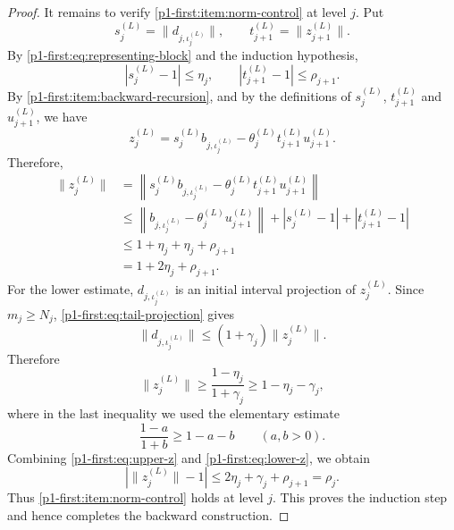 \documentclass[10pt,a4paper]{amsart}
\begin{document}
\begin{proof}
It remains to verify \ref{p1-first:item:norm-control} at level $j$. Put
\begin{equation*}
        s_j^{(L)}=\|d_{j,\iota_j^{(L)}}\|,
        \qquad
        t_{j+1}^{(L)}=\|z_{j+1}^{(L)}\|.
\end{equation*}
By \eqref{p1-first:eq:representing-block} and the induction hypothesis,
\begin{equation*}
        |s_j^{(L)}-1|\leq\eta_j,
        \qquad
        |t_{j+1}^{(L)}-1|\leq\rho_{j+1}.
\end{equation*}
By \ref{p1-first:item:backward-recursion}, and by the definitions of $s_j^{(L)}$, $t_{j+1}^{(L)}$ and $u_{j+1}^{(L)}$, we have
\begin{equation*}
        z_j^{(L)}=s_j^{(L)}b_{j,\iota_j^{(L)}}-\theta_j^{(L)}t_{j+1}^{(L)}u_{j+1}^{(L)}.
\end{equation*}
Therefore,
\begin{equation}
\label{p1-first:eq:upper-z}
\begin{aligned}
        \|z_j^{(L)}\|
        &=\left\|s_j^{(L)}b_{j,\iota_j^{(L)}}-\theta_j^{(L)}t_{j+1}^{(L)}u_{j+1}^{(L)}\right\|\\
        &\leq \left\|b_{j,\iota_j^{(L)}}-\theta_j^{(L)}u_{j+1}^{(L)}\right\|+|s_j^{(L)}-1|+|t_{j+1}^{(L)}-1|\\
        &\leq 1+\eta_j+\eta_j+\rho_{j+1}\\
        &=1+2\eta_j+\rho_{j+1}.
\end{aligned}
\end{equation}
For the lower estimate, $d_{j,\iota_j^{(L)}}$ is an initial interval projection of $z_j^{(L)}$. Since $m_j\geq N_j$, \eqref{p1-first:eq:tail-projection} gives
\begin{equation*}
        \|d_{j,\iota_j^{(L)}}\|\leq (1+\gamma_j)\|z_j^{(L)}\|.
\end{equation*}
Therefore
\begin{equation}
\label{p1-first:eq:lower-z}
        \|z_j^{(L)}\|\geq \frac{1-\eta_j}{1+\gamma_j}\geq 1-\eta_j-\gamma_j,
\end{equation}
where in the last inequality we used the elementary estimate
\begin{equation*}
        \frac{1-a}{1+b}\geq 1-a-b \qquad(a,b>0).
\end{equation*}
Combining \eqref{p1-first:eq:upper-z} and \eqref{p1-first:eq:lower-z}, we obtain
\begin{equation*}
        |\|z_j^{(L)}\|-1|\leq 2\eta_j+\gamma_j+\rho_{j+1}=\rho_j.
\end{equation*}
Thus \ref{p1-first:item:norm-control} holds at level $j$. This proves the induction step and hence completes the backward construction.


\end{proof}
\end{document}
